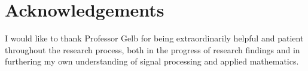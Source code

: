 \documentclass{article}
\begin{document}
\section{Acknowledgements}

I would like to thank Professor Gelb for being extraordinarily helpful and patient throughout the research process, both in the progress of research findings and in furthering my own understanding of signal processing and applied mathematics.




\end{document}
